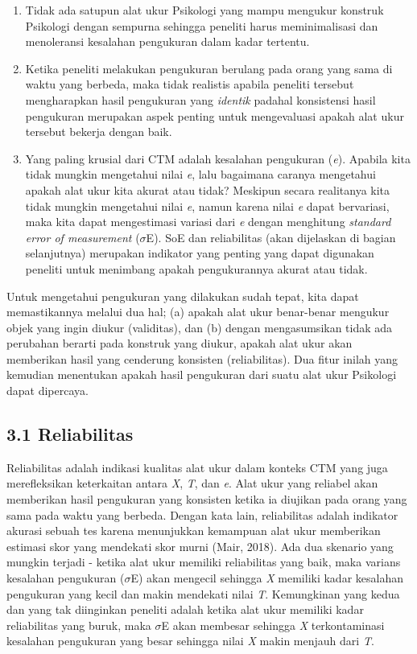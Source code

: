 \documentclass[
  english,
  man]{apa6}
\providecommand{\tightlist}{%
  \setlength{\itemsep}{0pt}\setlength{\parskip}{0pt}}
\begin{document}
\begin{enumerate}
\def\labelenumi{\arabic{enumi}.}
\tightlist
\item
  Tidak ada satupun alat ukur Psikologi yang mampu mengukur konstruk Psikologi dengan sempurna sehingga peneliti harus meminimalisasi dan menoleransi kesalahan pengukuran dalam kadar tertentu.
\item
  Ketika peneliti melakukan pengukuran berulang pada orang yang sama di waktu yang berbeda, maka tidak realistis apabila peneliti tersebut mengharapkan hasil pengukuran yang \emph{identik} padahal konsistensi hasil pengukuran merupakan aspek penting untuk mengevaluasi apakah alat ukur tersebut bekerja dengan baik.
\item
  Yang paling krusial dari CTM adalah kesalahan pengukuran (\emph{e}). Apabila kita tidak mungkin mengetahui nilai \emph{e}, lalu bagaimana caranya mengetahui apakah alat ukur kita akurat atau tidak? Meskipun secara realitanya kita tidak mungkin mengetahui nilai \emph{e}, namun karena nilai \emph{e} dapat bervariasi, maka kita dapat mengestimasi variasi dari \emph{e} dengan menghitung \emph{standard error of measurement} (\({\sigma}\)E). SoE dan reliabilitas (akan dijelaskan di bagian selanjutnya) merupakan indikator yang penting yang dapat digunakan peneliti untuk menimbang apakah pengukurannya akurat atau tidak.
\end{enumerate}

Untuk mengetahui pengukuran yang dilakukan sudah tepat, kita dapat memastikannya melalui dua hal; (a) apakah alat ukur benar-benar mengukur objek yang ingin diukur (validitas), dan (b) dengan mengasumsikan tidak ada perubahan berarti pada konstruk yang diukur, apakah alat ukur akan memberikan hasil yang cenderung konsisten (reliabilitas). Dua fitur inilah yang kemudian menentukan apakah hasil pengukuran dari suatu alat ukur Psikologi dapat dipercaya.

\hypertarget{reliabilitas}{%
\subsection{3.1 Reliabilitas}\label{reliabilitas}}

Reliabilitas adalah indikasi kualitas alat ukur dalam konteks CTM yang juga merefleksikan keterkaitan antara \emph{X}, \emph{T}, dan \emph{e}. Alat ukur yang reliabel akan memberikan hasil pengukuran yang konsisten ketika ia diujikan pada orang yang sama pada waktu yang berbeda. Dengan kata lain, reliabilitas adalah indikator akurasi sebuah tes karena menunjukkan kemampuan alat ukur memberikan estimasi skor yang mendekati skor murni (Mair, 2018). Ada dua skenario yang mungkin terjadi - ketika alat ukur memiliki reliabilitas yang baik, maka varians kesalahan pengukuran (\({\sigma}\)E) akan mengecil sehingga \emph{X} memiliki kadar kesalahan pengukuran yang kecil dan makin mendekati nilai \emph{T}. Kemungkinan yang kedua dan yang tak diinginkan peneliti adalah ketika alat ukur memiliki kadar reliabilitas yang buruk, maka \({\sigma}\)E akan membesar sehingga \emph{X} terkontaminasi kesalahan pengukuran yang besar sehingga nilai \emph{X} makin menjauh dari \emph{T}.
\end{document}
